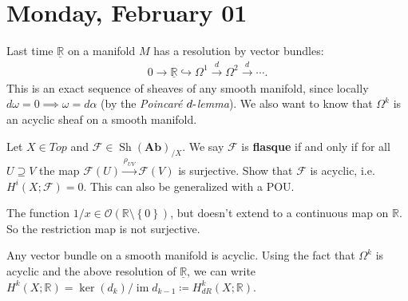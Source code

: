 \hypertarget{monday-february-01}{%
\section{Monday, February 01}\label{monday-february-01}}

\begin{remark}

Last time \(\underline{{\mathbb{R}}}\) on a manifold \(M\) has a
resolution by vector bundles:
\begin{align*}
0 \to \underline{{\mathbb{R}}} \hookrightarrow\Omega^1 \xrightarrow{d} \Omega^2 \xrightarrow{d} \cdots
.\end{align*}
This is an exact sequence of sheaves of any smooth manifold, since
locally \(d \omega = 0 \implies \omega = d \alpha\) (by the
\emph{Poincaré \(d {\hbox{-}}\)lemma}). We also want to know that
\(\Omega^k\) is an acyclic sheaf on a smooth manifold.

\end{remark}

\begin{exercise}[?]

Let \(X\in Top\) and
\(\mathcal{F}\in {\operatorname{Sh}}({\mathbf{Ab}})_{/X}\). We say
\(\mathcal{F}\) is \textbf{flasque} if and only if for all
\(U \supseteq V\) the map
\(\mathcal{F}(U) \xrightarrow{\rho_{UV}} \mathcal{F}(V)\) is surjective.
Show that \(\mathcal{F}\) is acyclic, i.e.~\(H^i(X; \mathcal{F}) = 0\).
This can also be generalized with a POU.

\end{exercise}

\begin{example}[?]

The function
\(1/x\in {\mathcal{O}}({\mathbb{R}}\setminus\left\{{0}\right\})\), but
doesn't extend to a continuous map on \({\mathbb{R}}\). So the
restriction map is not surjective.

\end{example}

\begin{remark}

Any vector bundle on a smooth manifold is acyclic. Using the fact that
\(\Omega^k\) is acyclic and the above resolution of
\(\underline{{\mathbb{R}}}\), we can write
\(H^k(X; {\mathbb{R}}) = \ker(d_k) / \operatorname{im}d_{k-1} \coloneqq H^k_{dR}(X; {\mathbb{R}})\).

\end{remark}

